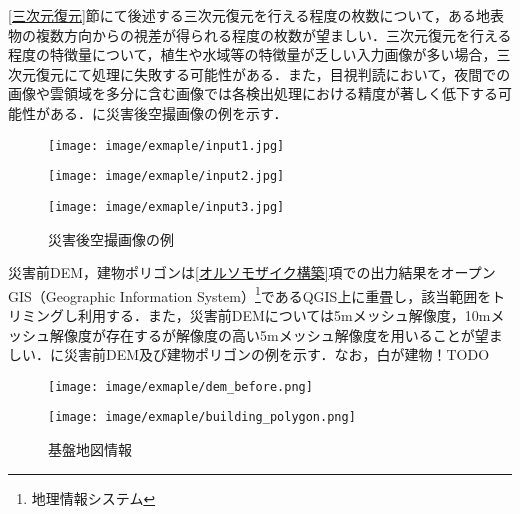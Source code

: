     \ref{三次元復元}節にて後述する三次元復元を行える程度の枚数について，ある地表物の複数方向からの視差が得られる程度の枚数が望ましい．三次元復元を行える程度の特徴量について，植生や水域等の特徴量が乏しい入力画像が多い場合，三次元復元にて処理に失敗する可能性がある．また，目視判読において，夜間での画像や雲領域を多分に含む画像では各検出処理における精度が著しく低下する可能性がある．に災害後空撮画像の例を示す．

    \begin{figure}[tbp]
      \begin{minipage}[c]{0.329\hsize}
        \centering
        \texttt{[image: image/exmaple/input1.jpg]}
        \label{入力画像例1}
      \end{minipage}
      \begin{minipage}[c]{0.329\hsize}
        \centering
        \texttt{[image: image/exmaple/input2.jpg]}
        \label{入力画像例2}
      \end{minipage}
      \begin{minipage}[c]{0.329\hsize}
        \centering
        \texttt{[image: image/exmaple/input3.jpg]}
        \label{入力画像例3}
      \end{minipage}
      \caption{災害後空撮画像の例}
      \label{空撮画像例}
    \end{figure}

    災害前DEM，建物ポリゴンは\ref{オルソモザイク構築}項での出力結果をオープンGIS（Geographic Information System）\footnote{地理情報システム}であるQGIS\cite{QGIS}上に重畳し，該当範囲をトリミングし利用する．また，災害前DEMについては5mメッシュ解像度，10mメッシュ解像度が存在するが解像度の高い5mメッシュ解像度を用いることが望ましい．に災害前DEM及び建物ポリゴンの例を示す．なお，白が建物！TODO
    
    \begin{figure}[tbp]
      \begin{minipage}[c]{0.45\hsize}
        \centering
        \texttt{[image: image/exmaple/dem\_before.png]}
      \end{minipage}
      \begin{minipage}[c]{0.45\hsize}
        \centering
        \texttt{[image: image/exmaple/building\_polygon.png]}
      \end{minipage}
      \caption{基盤地図情報}
      \label{基盤地図情報}
    \end{figure}


